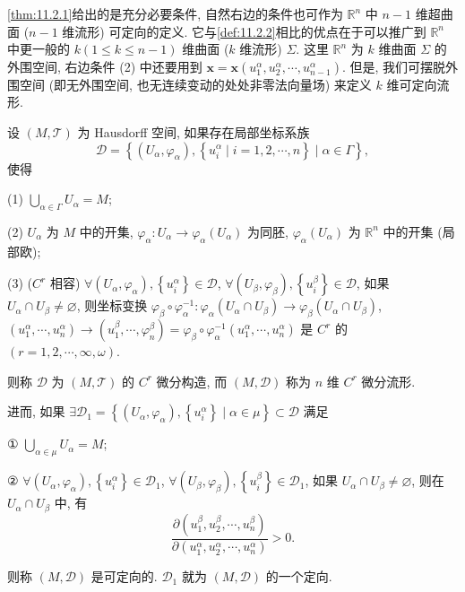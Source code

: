 \cref{thm:11.2.1}给出的是充分必要条件, 自然右边的条件也可作为 $\mathbb{R}^{n}$ 中 $n-1$ 维超曲面 ($n-1$ 维流形) 可定向的定义. 它与\cref{def:11.2.2}相比的优点在于可以推广到 $\mathbb{R}^{n}$ 中更一般的 $k(1 \leqslant k \leqslant n-1)$ 维曲面 ($k$ 维流形) $\Sigma$. 这里 $\mathbb{R}^{n}$ 为 $k$ 维曲面 $\Sigma$ 的外围空间, 右边条件 (2) 中还要用到 $\boldsymbol{x}=\boldsymbol{x}\left(u_{1}^{\alpha}, u_{2}^{\alpha}, \cdots, u_{n-1}^{\alpha}\right)$. 但是, 我们可摆脱外围空间 (即无外围空间, 也无连续变动的处处非零法向量场) 来定义 $k$ 维可定向流形.

\begin{definition}\label{def:11.2.4}
设 $(M, \mathcal{T})$ 为 Hausdorff 空间, 如果存在局部坐标系族
\[
  \mathcal{D}=\left\{\left(U_{\alpha}, \varphi_{\alpha}\right),\left\{u_{i}^{\alpha} \mid i=1,2, \cdots, n\right\} \mid \alpha \in \varGamma\right\},
\]
使得

(1) $\bigcup\limits_{\alpha \in \varGamma} U_{\alpha}=M$;

(2) $U_{\alpha}$ 为 $M$ 中的开集, $\varphi_{\alpha}: U_{\alpha} \to \varphi_{\alpha}\left(U_{\alpha}\right)$ 为同胚, $\varphi_{\alpha}\left(U_{\alpha}\right)$ 为 $\mathbb{R}^{n}$ 中的开集 (局部欧);

(3) ($C^{r}$ 相容) $\forall\left(U_{\alpha}, \varphi_{\alpha}\right),\left\{u_{i}^{\alpha}\right\} \in \mathcal{D}$, $\forall\left(U_{\beta}, \varphi_{\beta}\right),\left\{u_{i}^{\beta}\right\} \in \mathcal{D}$, 如果 $U_{\alpha} \cap U_{\beta} \neq \varnothing$, 则坐标变换 $\varphi_{\beta} \circ \varphi_{\alpha}^{-1}: \varphi_{\alpha}\left(U_{\alpha} \cap U_{\beta}\right) \to \varphi_{\beta}\left(U_{\alpha} \cap U_{\beta}\right)$, $\left(u_{1}^{\alpha}, \cdots, u_{n}^{\alpha}\right) \to\left(u_{1}^{\beta}, \cdots, \varphi_{n}^{\beta}\right)=\varphi_{\beta} \circ \varphi_{\alpha}^{-1}\left(u_{1}^{\alpha}, \cdots, u_{n}^{\alpha}\right)$ 是 $C^{r}$ 的 $(r=1,2, \cdots, \infty, \omega)$.

则称 $\mathcal{D}$ 为 $(M, \mathcal{T})$ 的 $C^{r}$ 微分构造, 而 $(M, \mathcal{D})$ 称为 $n$ 维 $C^{r}$ 微分流形.

进而, 如果 $\exists \mathcal{D}_{1}=\left\{\left(U_{\alpha}, \varphi_{\alpha}\right),\left\{u_{i}^{\alpha}\right\} \mid \alpha \in \mu\right\} \subset \mathcal{D}$ 满足

① $\bigcup\limits_{\alpha \in \mu} U_{\alpha}=M$;

② $\forall\left(U_{\alpha}, \varphi_{\alpha}\right),\left\{u_{i}^{\alpha}\right\} \in \mathcal{D}_{1}$, $\forall\left(U_{\beta}, \varphi_{\beta}\right),\left\{u_{i}^{\beta}\right\} \in \mathcal{D}_{1}$, 如果 $U_{\alpha} \cap U_{\beta} \neq \varnothing$, 则在 $U_{\alpha} \cap U_{\beta}$ 中, 有
\[
  \frac{\partial\left(u_{1}^{\beta}, u_{2}^{\beta}, \cdots, u_{n}^{\beta}\right)}{\partial\left(u_{1}^{\alpha}, u_{2}^{\alpha}, \cdots, u_{n}^{\alpha}\right)}>0.
\]

则称 $(M, \mathcal{D})$ 是可定向的. $\mathcal{D}_{1}$ 就为 $(M, \mathcal{D})$ 的一个定向.
\end{definition}

